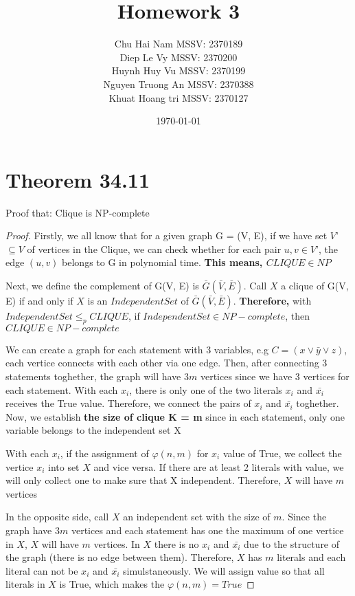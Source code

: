 \documentclass{article}
\title{Homework 3}
\author{Chu Hai Nam MSSV: 2370189 \\
        Diep Le Vy MSSV: 2370200 \\
        Huynh Huy Vu MSSV: 2370199 \\
        Nguyen Truong An MSSV: 2370388\\
        Khuat Hoang tri MSSV: 2370127}
\date\today
\begin{document}
\maketitle %

\section*{Theorem 34.11}
    Proof that: Clique is NP-complete

\begin{proof}
    Firstly, we all know that for a given graph G = (V, E), if we have set 
    $V$'$ \subseteq V$ of vertices in the Clique, we can check whether for each pair
    $ u, v \in V$'$ $, the edge $ (u, v) $ belongs to G in polynomial time.
    \textbf{This means, $ CLIQUE \in NP $}

    Next, we define the complement of G(V, E) is $ \bar{G} (\bar{V}, \bar{E}) $.
    Call $X$ a clique of G(V, E) if and only if $X$ is an $ IndependentSet $ of
    $ \bar{G} (\bar{V}, \bar{E}) $. \textbf{Therefore,} with $ IndependentSet \leq_p CLIQUE $, 
    if $ IndependentSet \in NP-complete $, then $ CLIQUE \in NP-complete $

    We can create a graph for each statement with 3 variables, e.g $C = (x  \lor \bar{y} \lor z)$, each vertice connects with each other via one edge.
    Then, after connecting 3 statements toghether, the graph will have $3m$ vertices since we have 3 vertices for each statement.
    With each $x_i$, there is only one of the two literals $x_i$ and $ \bar{x_i} $ receives the True value. Therefore, we connect the pairs
    of $x_i$ and $ \bar{x_i} $ toghether. Now, we establish \textbf{the size of clique K = m} since in each statement, only one variable belongs to
    the independent set X

    With each $x_i$, if the assignment of $ \varphi (n, m) $ for $x_i$ value of True, we collect the vertice $x_i$ into set $X$ and vice versa.
    If there are at least 2 literals with value, we will only collect one to make sure that X independent. Therefore, $X$ will have $m$ vertices

    In the opposite side, call $X$ an independent set with the size of $m$. Since the graph have $3m$ vertices and each statement has one the maximum
    of one vertice in $X$, $X$ will have $m$ vertices. In $X$ there is no $x_i$ and $ \bar{x_i} $ due to the structure of the graph (there is no edge
    between them). Therefore, $X$ has $m$ literals and each literal can not be $x_i$ and $ \bar{x_i} $ simulstaneously. We will assign value so that all
    literals in $X$ is True, which makes the $ \varphi (n, m) = True $


\end{proof}
\end{document}

